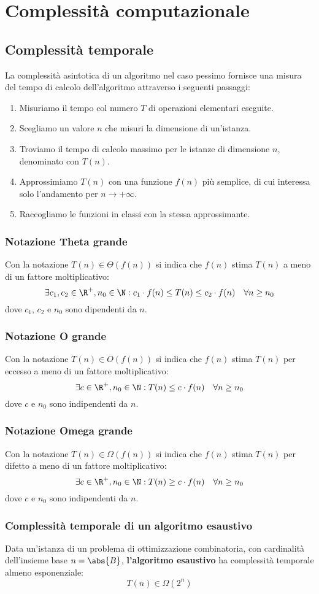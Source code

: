 \documentclass[\main/main.tex]{subfiles}
\begin{document}
\chapter{Complessità computazionale}

\section{Complessità temporale}
La complessità asintotica di un algoritmo nel caso pessimo fornisce una misura del tempo di calcolo dell'algoritmo attraverso i seguenti passaggi:
\begin{enumerate}
  \item Misuriamo il tempo col numero \(T\) di operazioni elementari eseguite.
  \item Scegliamo un valore \(n\) che misuri la dimensione di un'istanza.
  \item Troviamo il tempo di calcolo massimo per le istanze di dimensione \(n\), denominato con \(T(n)\).
  \item Approssimiamo \(T(n)\) con una funzione \(f(n)\) più semplice, di cui interessa solo l'andamento per \(n\rightarrow + \infty \).
  \item Raccogliamo le funzioni in classi con la stessa approssimante.
\end{enumerate}

\subsection{Notazione Theta grande}
Con la notazione \(T(n) \in \Theta(f(n)) \) si indica che \(f(n)\) stima \(T(n)\) a meno di un fattore moltiplicativo:
\[
  \exists c_1, c_2 \in \R^+, n_0 \in \N: c_1 \cdot f(n) \leq T(n) \leq c_2 \cdot f(n) \quad \forall n \geq n_0
\]
dove \(c_1\), \(c_2\) e \(n_0\) sono dipendenti da \(n\).

\subsection{Notazione O grande}
Con la notazione \(T(n) \in O(f(n))\) si indica che \(f(n)\) stima \(T(n)\) per eccesso a meno di un fattore moltiplicativo:
\[
  \exists c \in \R^+, n_0 \in \N: T(n) \leq c\cdot f(n) \quad \forall n \geq n_0
\]
dove \(c\) e \(n_0\) sono indipendenti da \(n\).

\subsection{Notazione Omega grande}
Con la notazione \(T(n) \in \Omega(f(n))\) si indica che \(f(n)\) stima \(T(n)\) per difetto a meno di un fattore moltiplicativo:
\[
  \exists c \in \R^+, n_0 \in \N: T(n) \geq c\cdot f(n) \quad \forall n \geq n_0
\]
dove \(c\) e \(n_0\) sono indipendenti da \(n\).

\subsection{Complessità temporale di un algoritmo esaustivo}
Data un'istanza di un problema di ottimizzazione combinatoria, con cardinalità dell'insieme base \(n=\abs{B}\), \textbf{l'algoritmo esaustivo} ha complessità temporale almeno esponenziale:
\[
  T(n) \in \Omega(2^n)
\]
\end{document}
